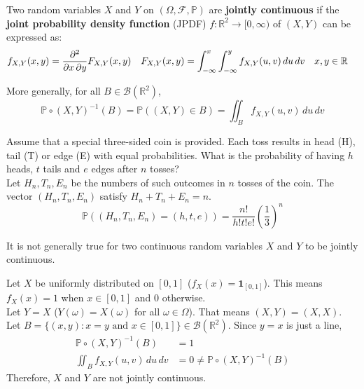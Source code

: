\documentclass{huhtakm-template-book}
\newcommand{\prob}{\mathbb{P}}
\begin{document}
\begin{defn}
	Two random variables $X$ and $Y$ on $(\Omega,\mathcal{F},\prob)$ are \textbf{jointly continuous} if the \textbf{joint probability density function} (JPDF) $f:\mathbb{R}^{2}\to [0,\infty)$ of $(X,Y)$ can be expressed as:
	\begin{align*}
		f_{X,Y}(x,y)&=\pdv*{F_{X,Y}(x,y)}{x,y} & F_{X,Y}(x,y)&=\int_{-\infty}^{x}\int_{-\infty}^{y}f_{X,Y}(u,v)\,du\,dv & x,y&\in\mathbb{R}
	\end{align*}
\end{defn}
\begin{rem}
	More generally, for all $B\in\mathcal{B}(\mathbb{R}^{2})$,
	\begin{equation*}
		\prob\circ(X,Y)^{-1}(B)=\prob((X,Y)\in B)=\iint_{B}f_{X,Y}(u,v)\,du\,dv
	\end{equation*}
\end{rem}
\begin{eg}
	Assume that a special three-sided coin is provided. Each toss results in head (H), tail (T) or edge (E) with equal probabilities. What is the probability of having $h$ heads, $t$ tails and $e$ edges after $n$ tosses?\\
	Let $H_{n},T_{n},E_{n}$ be the numbers of such outcomes in $n$ tosses of the coin. The vector $(H_{n},T_{n},E_{n})$ satisfy $H_{n}+T_{n}+E_{n}=n$.
	\begin{equation*}
		\prob((H_{n},T_{n},E_{n})=(h,t,e))=\frac{n!}{h!t!e!}\left(\frac{1}{3}\right)^{n}
	\end{equation*}
\end{eg}
\begin{rem}
	It is not generally true for two continuous random variables $X$ and $Y$ to be jointly continuous.
\end{rem}
\begin{eg}
	Let $X$ be uniformly distributed on $[0,1]$ ($f_{X}(x)=\mathbf{1}_{[0,1]}$). This means $f_{X}(x)=1$ when $x\in[0,1]$ and $0$ otherwise.\\
	Let $Y=X$ ($Y(\omega)=X(\omega)$ for all $\omega\in\Omega$). That means $(X,Y)=(X,X)$.\\
	Let $B=\{(x,y):x=y\text{ and }x\in[0,1]\}\in\mathcal{B}(\mathbb{R}^{2})$. Since $y=x$ is just a line,
	\begin{align*}
		\prob\circ(X,Y)^{-1}(B)&=1\\
		\iint_{B}f_{X,Y}(u,v)\,du\,dv&=0\neq\prob\circ(X,Y)^{-1}(B)
	\end{align*}
	Therefore, $X$ and $Y$ are not jointly continuous.
\end{eg}
\end{document}
